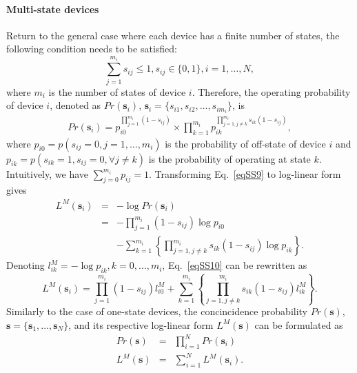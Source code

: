 \paragraph*{Multi-state devices}
Return to the general case where each device has a finite number of states, the following condition needs to be satisfied:
\begin{equation}
\sum_{j=1}^{m_i}{s_{ij}}\leq 1,s_{ij} \in \{0,1\}, i=1,\ldots,N,
\end{equation}
where $m_i$ is the number of states of device $i$.
Therefore, the operating probability of device $i$, denoted as $Pr(\mathbf{s}_i)$, $\mathbf{s}_i = \{s_{i1},s_{i2},\ldots,s_{im_i}\}$, is
\begin{eqnarray}\label{eqSS9}
Pr(\mathbf{s}_i) = p_{i0}^{\prod_{j=1}^{m_i}{(1-s_{ij})}}\times \prod_{k=1}^{m_i}{p_{ik}^{\prod_{j=1,j\neq k}^{m_i}{s_{ik}(1-s_{ij})}}},
\end{eqnarray}
where  $p_{i0} = p(s_{ij}=0, j=1,\ldots,m_i)$ is the probability of off-state of device $i$ and $p_{ik} = p(s_{ik}=1,s_{ij}=0,\forall j\neq k)$ is the probability of operating at state $k$. Intuitively, we have $\sum_{j=0}^{m_i}{p_{ij}}=1$. 
Transforming Eq.~\eqref{eqSS9} to log-linear form gives
\begin{eqnarray}\label{eqSS10}
L^M(\mathbf{s}_i) &=& -\log{Pr(\mathbf{s}_i)} \nonumber\\
&=& -\prod_{j=1}^{m_i}{(1-s_{ij})}\log{p_{i0}} \nonumber \\
&& - \sum_{k=1}^{m_i}{\left\{\prod_{j=1,j\neq k}^{m_i}{s_{ik}(1-s_{ij})}\log{p_{ik}}\right\}}.
\end{eqnarray}
Denoting $l^M_{ik} = -\log{p_{ik}}, k=0,\ldots,m_i$, Eq.~\eqref{eqSS10} can be rewritten as
\begin{equation}
L^M(\mathbf{s}_i) = \prod_{j=1}^{m_i}{(1-s_{ij})l^M_{i0}}+\sum_{k=1}^{m_i}{\left\{\prod_{j=1,j\neq k}^{m_i}{s_{ik}(1-s_{ij})}l^M_{ik}\right\}}.
\end{equation}
Similarly to the case of one-state devices, the concincidence probability $Pr(\mathbf{s})$, $\mathbf{s} = \{\mathbf{s}_1,\ldots,\mathbf{s}_N\}$, and its respective log-linear form $L^M(\mathbf{s})$ can be formulated as
\begin{eqnarray}\label{eqSS11}
Pr(\mathbf{s}) &=& \prod_{i=1}^N{Pr(\mathbf{s}_i)}\\
L^M(\mathbf{s})& =& \sum_{i=1}^N{L^M(\mathbf{s}_i)}.
\end{eqnarray}

